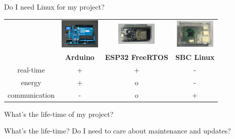 \documentclass{beamer}
\begin{document}
\begin{frame}{Do I need Linux for my project?}
	\begin{tabular}{cccc}
	&\includegraphics[width=1.9cm]{assets/Pixabay_Arduino_integrated-circuit-441289_1280.jpg} &
	\includegraphics[width=1.9cm]{assets/ESP32.png} & 
	\includegraphics[width=1.9cm]{assets/Raspberry_Pi.png} \\
	&\textbf{Arduino} & \textbf{ESP32 FreeRTOS} & \textbf{SBC Linux} \\
	real-time & + &  + & - \\
	energy & + & o & - \\
	communication & - & o & + \\
	\end{tabular}
\end{frame}

\begin{frame}{What's the life-time of my project?}
	\begin{block}{What's the life-time?}
		Do I need to care about maintenance and updates?
	\end{block}
\end{frame}
\end{document}
